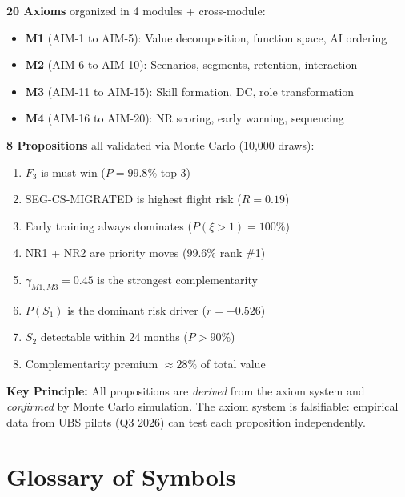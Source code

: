 \begin{tcolorbox}[colback=blue!5!white, colframe=blue!75!black,
    title=Summary: AI Marketing Transformation Axiom System]

\textbf{20 Axioms} organized in 4 modules + cross-module:
\begin{itemize}[nosep]
\item \textbf{M1} (AIM-1 to AIM-5): Value decomposition, function space, AI ordering
\item \textbf{M2} (AIM-6 to AIM-10): Scenarios, segments, retention, interaction
\item \textbf{M3} (AIM-11 to AIM-15): Skill formation, DC, role transformation
\item \textbf{M4} (AIM-16 to AIM-20): NR scoring, early warning, sequencing
\end{itemize}

\textbf{8 Propositions} all validated via Monte Carlo (10,000 draws):
\begin{enumerate}[nosep]
\item $F_3$ is must-win ($P = 99.8\%$ top 3)
\item SEG-CS-MIGRATED is highest flight risk ($R = 0.19$)
\item Early training always dominates ($P(\xi > 1) = 100\%$)
\item NR1 + NR2 are priority moves ($99.6\%$ rank \#1)
\item $\gamma_{M1,M3} = 0.45$ is the strongest complementarity
\item $P(S_1)$ is the dominant risk driver ($r = -0.526$)
\item $S_2$ detectable within 24 months ($P > 90\%$)
\item Complementarity premium $\approx 28\%$ of total value
\end{enumerate}

\textbf{Key Principle:} All propositions are \emph{derived} from the axiom system
and \emph{confirmed} by Monte Carlo simulation. The axiom system is
falsifiable: empirical data from UBS pilots (Q3 2026) can test each
proposition independently.
\end{tcolorbox}


\section{Glossary of Symbols}
\label{sec:aim-glossary}

